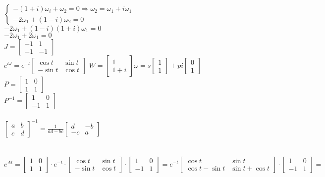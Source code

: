 $\begin{cases}-(1+i)\omega_i+\omega_2=0 \Rightarrow \omega_2=\omega_1+i\omega_1 \\-2\omega_1+(1-i)\omega_2=0\end{cases}$\\
$-2\omega_1+(1-i)(1+i)\omega_1=0$\\
$-2\omega_1+2\omega_1=0$\\
$J=\left[\begin{array}{cc}-1&1\\-1&-1\end{array}\right]$\\
$e^{tJ}=e^{-t}\left[\begin{array}{cc}\cos t & \sin t \\ -\sin t & \cos t\end{array}\right]$
$W=\left[\begin{array}{c}1\\1+i\end{array}\right]\omega=s\left[\begin{array}{c}1\\1\end{array}\right]+pi\left[\begin{array}{c}0\\1\end{array}\right]$\\
$P=\left[\begin{array}{cc}1&0\\1&1\end{array}\right]$\\
$P^{-1}=\left[\begin{array}{cc}1&0\\-1&1\end{array}\right]$\\\\
$\boxed{\left[\begin{array}{cc}a&b\\c&d\end{array}\right]^{-1}=\frac{1}{ad-bc}\left[\begin{array}{cc}d&-b\\-c&a\end{array}\right]}$\\\\\\
$e^{At}=\left[\begin{array}{cc}1&0\\1&1\end{array}\right]\cdot e^{-t}\cdot\left[\begin{array}{cc}\cos t&\sin t \\-\sin t &\cos t\end{array}\right]\cdot \left[\begin{array}{cc}1&0\\-1&1\end{array}\right]=e^{-t}\left[\begin{array}{cc}\cos t & \sin t \\ \cos t-\sin t & \sin t +\cos t\end{array}\right]\cdot \left[\begin{array}{cc}1&0\\-1 &1\end{array}\right]=$\\
